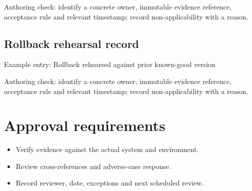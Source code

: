 \documentclass[10pt,letterpaper]{article}
\begin{document}
Authoring check: identify a concrete owner, immutable evidence reference, acceptance rule and relevant timestamp; record non-applicability with a reason.


\subsection{Rollback rehearsal record}
Example entry: Rollback rehearsed against prior known-good version

Authoring check: identify a concrete owner, immutable evidence reference, acceptance rule and relevant timestamp; record non-applicability with a reason.


\section{Approval requirements}
\begin{itemize}
\item Verify evidence against the actual system and environment.
\item Review cross-references and adverse-case response.
\item Record reviewer, date, exceptions and next scheduled review.
\end{itemize}
\end{document}
